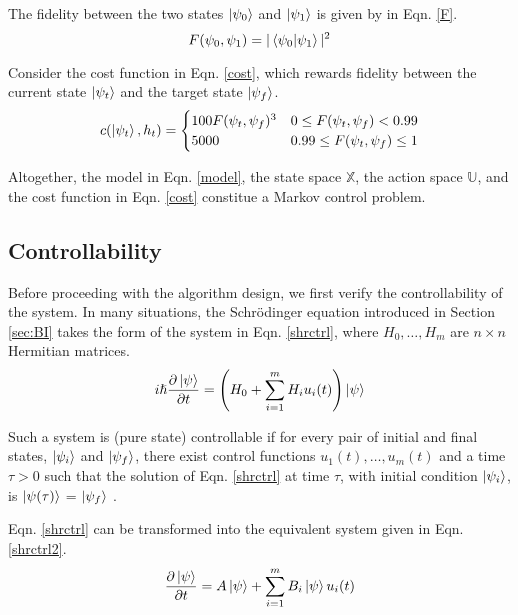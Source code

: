 \documentclass[{../RL_for_QSP.tex}]{subfiles}
\begin{document}
The fidelity between the two states $\ket{\psi_0}$ and $\ket{\psi_1}$ is given by in Eqn. \ref{F}.
\begin{equation}\label{F}
     F(\psi_0, \psi_1) = |\braket{\psi_0}{\psi_1}|^2
\end{equation}

Consider the cost function in Eqn. \ref{cost}, which rewards fidelity between the current state $\ket{\psi_t}$ and the target state $\ket{\psi_f}$.
\begin{equation}\label{cost}
     c(\ket{\psi_t},h_t) = \begin{cases} 
     100F(\psi_t, \psi_f)^3 & 0 \leq F(\psi_t, \psi_f) < 0.99 \\
     5000 & 0.99 \leq F(\psi_t, \psi_f) \leq 1
     \end{cases}
\end{equation}

Altogether, the model in Eqn. \ref{model}, the state space $\mathbb{X}$, the action space $\mathbb{U}$, and the cost function in Eqn. \ref{cost} constitue a Markov control problem.

\subsection{Controllability}

Before proceeding with the algorithm design, we first verify the controllability of the system. In many situations, the Schrödinger equation introduced in Section \ref{sec:BI} takes the form of the system in Eqn. \ref{shrctrl}, where $H_0, \hdots, H_m$ are $n \times n$ Hermitian matrices.
\begin{equation}\label{shrctrl}
     i \hslash \frac{\partial \ket{\psi}}{\partial t} =  \left( H_0  + \sum_{i=1}^m H_i u_i(t) \right) \ket{\psi}
\end{equation}

Such a system is (pure state) controllable if for every pair of initial and final states, $\ket{\psi_i}$ and $\ket{\psi_f}$, there exist control functions $u_1(t), \hdots, u_m(t)$ and a time $\tau > 0$ such that the solution of Eqn. \ref{shrctrl} at time $\tau$, with initial condition $\ket{\psi_i}$, is $\ket{\psi(\tau)}$ = $\ket{\psi_f}$ \cite{d2007introduction}. 

Eqn. \ref{shrctrl} can be transformed into the equivalent system given in Eqn. \ref{shrctrl2}.
\begin{equation}\label{shrctrl2}
     \frac{\partial \ket{\psi}}{\partial t} = A \ket{\psi} + \sum_{i=1}^m B_i \ket{\psi} u_i(t)
\end{equation}
\end{document}
